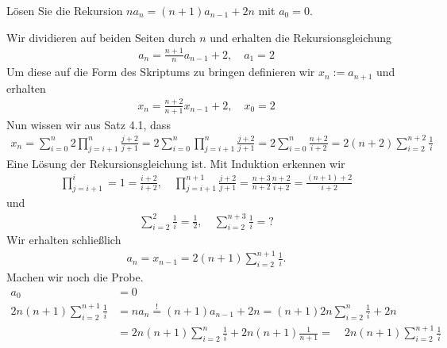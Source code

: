 
\begin{exercise}

	Lösen Sie die Rekursion $n a_n = (n + 1) a_{n - 1} + 2n$ mit $a_0 = 0$.

\end{exercise}


\begin{solution}

	Wir dividieren auf beiden Seiten durch $n$ und erhalten die Rekursionsgleichung
	\begin{align*}
	a_n = \frac{n + 1}{n} a_{n - 1} + 2, \quad a_1 = 2
	\end{align*}
	Um diese auf die Form des Skriptums zu bringen definieren wir $x_n := a_{n + 1}$ und erhalten
	\begin{align*}
	x_n = \frac{n + 2}{n + 1} x_{n -1} + 2, \quad x_0 = 2
	\end{align*}
	Nun wissen wir aus Satz 4.1, dass
	\begin{align*}
	x_n = \sum_{i = 0}^n 2 \prod_{j =  i + 1}^n \frac{j + 2}{j + 1}  = 2 \sum_{i = 0}^n \prod_{j =  i + 1}^n \frac{j + 2}{j + 1} = 2 \sum_{i = 0}^n \frac{n + 2}{i + 2} = 2 (n + 2) \sum_{i=2}^{n+2} \frac{1}{i}
	\end{align*}
	Eine Lösung der Rekursionsgleichung ist. Mit Induktion erkennen wir
	\begin{align*}
	\prod_{j=i+1}^i = 1 = \frac{i + 2}{i + 2}, \quad \prod_{j = i+1}^{n + 1} \frac{j + 2}{j + 1} = \frac{n + 3}{n + 2} \frac{n + 2}{i + 2} = \frac{(n + 1) + 2}{i + 2}
	\end{align*}
	und
	\begin{align*}
	\sum_{i = 2}^2 \frac{1}{i} = \frac{1}{2}, \quad \sum_{i = 2}^{n + 3} \frac{1}{i} = ?
	\end{align*}
	Wir erhalten schließlich
	\begin{align*}
	a_n = x_{n - 1} = 2 (n + 1) \sum_{i = 2}^{n + 1} \frac{1}{i}.
	\end{align*}
	Machen wir noch die Probe.
	\begin{align*}
	a_0 &= 0 \\
	2n(n + 1) \sum_{i = 2}^{n + 1} \frac{1}{i} &= n a_n \stackrel{!}{=} (n + 1) a_{n - 1} + 2n = (n + 1) 2n \sum_{i = 2}^{n} \frac{1}{i} + 2n \\
	&= 2n (n + 1)  \sum_{i = 2}^{n} \frac{1}{i} + 2n (n + 1) \frac{1}{n + 1} = \quad 2n(n + 1) \sum_{i = 2}^{n + 1} \frac{1}{i}
	\end{align*}
\end{solution}

